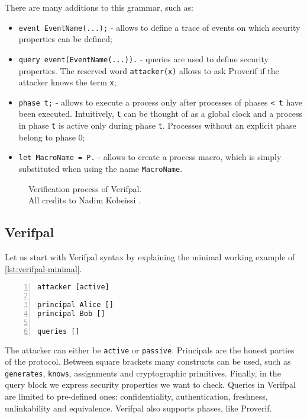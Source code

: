 \lstset{language=proverif}
There are many additions to this grammar, such as:
\begin{itemize}
    \item{\lstinline{event EventName(...);} - allows to define a trace of events on which security properties can be defined;}
    \item{\lstinline{query event(EventName(...)).} - queries are used to define security properties. The reserved word \lstinline{attacker(x)} allows to ask Proverif if the attacker knows the term \lstinline{x};}
    \item{\lstinline{phase t;} - allows to execute a process only after processes of phases \lstinline{< t} have been executed. Intuitively, \lstinline{t} can be thought of as a global clock and a process in phase \lstinline{t}  is active only during phase \lstinline{t}. Processes without an explicit phase belong to phase 0;}
    \item{\lstinline{let MacroName = P.} - allows to create a process macro, which is simply substituted when using the name \lstinline{MacroName}.}
\end{itemize}


\begin{figure}[t]
    \centering
    \caption{Verification process of Verifpal.\\ All credits to Nadim Kobeissi \cite{VerifpalManual}.}
    \label{fig:verifpal-verification}
\end{figure}


\subsection{Verifpal}


Let us start with Verifpal syntax by explaining the minimal working example of \cref{lst:verifpal-minimal}.

\lstset{language=verifpal}
\begin{lstlisting}[numbers=left,caption={Verifpal's minimal working example}, label={lst:verifpal-minimal}]
attacker [active]

principal Alice []
principal Bob []

queries []
\end{lstlisting}

The attacker can either be \lstinline{active} or \lstinline{passive}.
Principals are the honest parties of the protocol. Between square brackets many constructs can be used, such as \lstinline{generates}, \lstinline{knows}, assignments and cryptographic primitives.
Finally, in the query block we express security properties we want to check. Queries in Verifpal are limited to pre-defined ones: confidentiality, authentication, freshness, unlinkability and equivalence.
Verifpal also supports phases, like Proverif.


